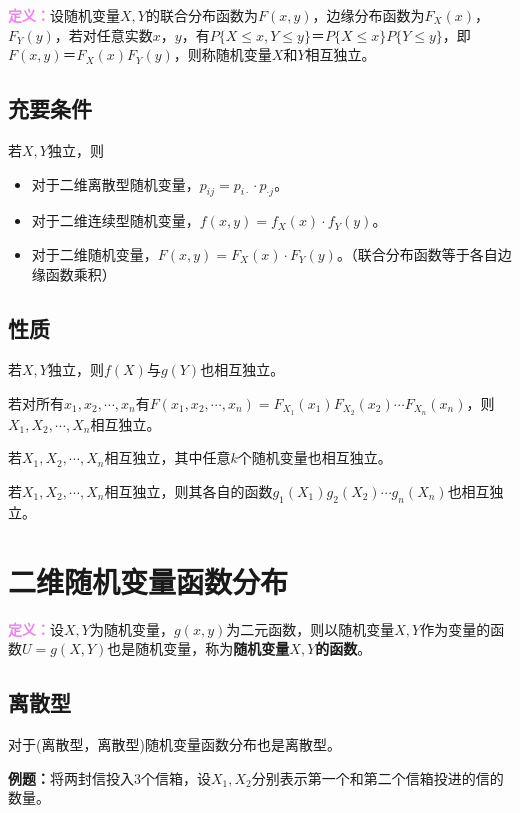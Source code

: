\documentclass[UTF8, 12pt]{ctexart}
\begin{document}
\textcolor{violet}{\textbf{定义：}}设随机变量$X,Y$的联合分布函数为$F(x,y)$，边缘分布函数为$F_X(x)$，$F_Y(y)$，若对任意实数$x$，$y$，有$P\{X\leqslant x,Y\leqslant y\}＝P\{X\leqslant x\}P\{Y\leqslant y\}$，即$F(x,y)＝F_X(x)F_Y(y)$，则称随机变量$X$和$Y$相互独立。

\subsection{充要条件}

若$X,Y$独立，则

\begin{itemize}
    \item 对于二维离散型随机变量，$p_{ij}=p_{i\cdot}\cdot p_{\cdot j}$。
    \item 对于二维连续型随机变量，$f(x,y)=f_X(x)\cdot f_Y(y)$。
    \item 对于二维随机变量，$F(x,y)=F_X(x)\cdot F_Y(y)$。（联合分布函数等于各自边缘函数乘积）
\end{itemize}

\subsection{性质}

若$X,Y$独立，则$f(X)$与$g(Y)$也相互独立。

若对所有$x_1,x_2,\cdots,x_n$有$F(x_1,x_2,\cdots,x_n)=F_{X_1}(x_1)F_{X_2}(x_2)\cdots F_{X_n}(x_n)$，则$X_1,X_2,\cdots,X_n$相互独立。

若$X_1,X_2,\cdots,X_n$相互独立，其中任意$k$个随机变量也相互独立。

若$X_1,X_2,\cdots,X_n$相互独立，则其各自的函数$g_1(X_1)g_2(X_2)\cdots g_n(X_n)$也相互独立。

\section{二维随机变量函数分布}

\textcolor{violet}{\textbf{定义：}}设$X,Y$为随机变量，$g(x,y)$为二元函数，则以随机变量$X,Y$作为变量的函数$U=g(X,Y)$也是随机变量，称为\textbf{随机变量$X,Y$的函数}。

\subsection{离散型}

对于(离散型，离散型)随机变量函数分布也是离散型。

\textbf{例题：}将两封信投入3个信箱，设$X_1,X_2$分别表示第一个和第二个信箱投进的信的数量。
\end{document}
